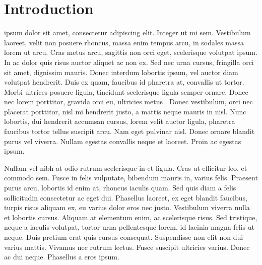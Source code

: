 \section{Introduction}\label{sec:10-intro}%
 ipsum dolor sit amet, consectetur adipiscing elit. Integer ut mi sem. Vestibulum laoreet, velit non posuere rhoncus, massa enim tempus arcu, in sodales massa lorem ut arcu. Cras metus arcu, sagittis non orci eget, scelerisque volutpat ipsum. In ac dolor quis risus auctor aliquet ac non ex. Sed nec urna cursus, fringilla orci sit amet, dignissim mauris. Donec interdum lobortis ipsum, vel auctor diam volutpat hendrerit. Duis ex quam, faucibus id pharetra at, convallis ut tortor. Morbi ultrices posuere ligula, tincidunt scelerisque ligula semper ornare. Donec nec lorem porttitor, gravida orci eu, ultricies metus \dummy. Donec vestibulum, orci nec placerat porttitor, nisl mi hendrerit justo, a mattis neque mauris in nisl. Nunc lobortis, dui hendrerit accumsan cursus, lorem velit auctor ligula, pharetra faucibus tortor tellus suscipit arcu. Nam eget pulvinar nisl. Donec ornare blandit purus vel viverra. Nullam egestas convallis neque et laoreet. Proin ac egestas ipsum.


Nullam vel nibh at odio rutrum scelerisque in et ligula. Cras ut efficitur leo, et commodo sem. Fusce in felis vulputate, bibendum mauris in, varius felis. Praesent purus arcu, lobortis id enim at, rhoncus iaculis quam. Sed quis diam a felis sollicitudin consectetur ac eget dui. Phasellus laoreet, ex eget blandit faucibus, turpis risus aliquam ex, eu varius dolor eros nec justo. Vestibulum viverra nulla et lobortis cursus. Aliquam at elementum enim, ac scelerisque risus. Sed tristique, neque a iaculis volutpat, tortor urna pellentesque lorem, id lacinia magna felis ut neque. Duis pretium erat quis cursus consequat. Suspendisse non elit non dui varius mattis. Vivamus nec rutrum lectus. Fusce suscipit ultricies varius. Donec ac dui neque. Phasellus a eros ipsum.

